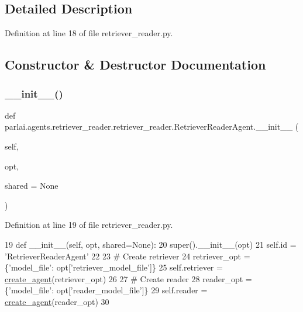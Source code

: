 \subsection{Detailed Description}


Definition at line 18 of file retriever\+\_\+reader.\+py.



\subsection{Constructor \& Destructor Documentation}
\mbox{\label{classparlai_1_1agents_1_1retriever__reader_1_1retriever__reader_1_1RetrieverReaderAgent_a7777973d732eccc4a630116d8a9462f1}} 
\subsubsection{\texorpdfstring{\+\_\+\+\_\+init\+\_\+\+\_\+()}{\_\_init\_\_()}}
{\footnotesize\ttfamily def parlai.\+agents.\+retriever\+\_\+reader.\+retriever\+\_\+reader.\+Retriever\+Reader\+Agent.\+\_\+\+\_\+init\+\_\+\+\_\+ (\begin{DoxyParamCaption}\item[{}]{self,  }\item[{}]{opt,  }\item[{}]{shared = {\ttfamily None} }\end{DoxyParamCaption})}



Definition at line 19 of file retriever\+\_\+reader.\+py.


\begin{DoxyCode}
19     \textcolor{keyword}{def }\_\_init\_\_(self, opt, shared=None):
20         super().\_\_init\_\_(opt)
21         self.id = \textcolor{stringliteral}{'RetrieverReaderAgent'}
22 
23         \textcolor{comment}{# Create retriever}
24         retriever\_opt = \{\textcolor{stringliteral}{'model\_file'}: opt[\textcolor{stringliteral}{'retriever\_model\_file'}]\}
25         self.retriever = \hyperlink{namespaceparlai_1_1core_1_1agents_a00d77a7e26fb89e8bd900f7b2a02982a}{create\_agent}(retriever\_opt)
26 
27         \textcolor{comment}{# Create reader}
28         reader\_opt = \{\textcolor{stringliteral}{'model\_file'}: opt[\textcolor{stringliteral}{'reader\_model\_file'}]\}
29         self.reader = \hyperlink{namespaceparlai_1_1core_1_1agents_a00d77a7e26fb89e8bd900f7b2a02982a}{create\_agent}(reader\_opt)
30 
\end{DoxyCode}


